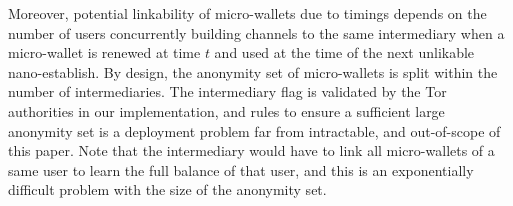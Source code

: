 Moreover, potential linkability of micro-wallets due to timings 
depends on the number of users concurrently building channels to the 
same intermediary when a micro-wallet is renewed at time $t$ and 
used at the time of the next unlikable nano-establish. By design, 
the anonymity set of micro-wallets is split within the number of 
intermediaries. The intermediary flag is validated by the Tor 
authorities in our implementation, and rules to ensure a sufficient 
large anonymity set is a deployment problem far from intractable, 
and out-of-scope of this paper. Note that the intermediary would 
have to link all micro-wallets of a same user to learn the full 
balance of that user, and this is an exponentially difficult problem 
with the size of the anonymity set. 

%
%
% 
%

